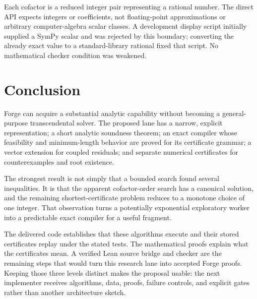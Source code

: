 Each cofactor is a reduced integer pair representing a rational number. The direct API expects integers or  coefficients, not floating-point approximations or arbitrary computer-algebra scalar classes. A development display script initially supplied a SymPy scalar and was rejected by this boundary; converting the already exact value to a standard-library rational fixed that script. No mathematical checker condition was weakened.

\section{Conclusion}

Forge can acquire a substantial analytic capability without becoming a general-purpose transcendental solver. The proposed lane has a narrow, explicit representation; a short analytic soundness theorem; an exact compiler whose feasibility and minimum-length behavior are proved for its certificate grammar; a vector extension for coupled residuals; and separate numerical certificates for counterexamples and root existence.

The strongest result is not simply that a bounded search found several inequalities. It is that the apparent cofactor-order search has a canonical solution, and the remaining shortest-certificate problem reduces to a monotone choice of one integer. That observation turns a potentially exponential exploratory worker into a predictable exact compiler for a useful fragment.

The delivered code establishes that these algorithms execute and their stored certificates replay under the stated tests. The mathematical proofs explain what the certificates mean. A verified Lean source bridge and checker are the remaining steps that would turn this research lane into accepted Forge proofs. Keeping those three levels distinct makes the proposal usable: the next implementer receives algorithms, data, proofs, failure controls, and explicit gates rather than another architecture sketch.
